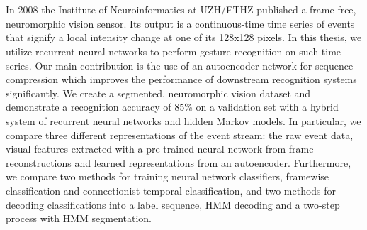 \chapter{\abstractname}

In 2008 the Institute of Neuroinformatics at UZH/ETHZ published a frame-free,
neuromorphic vision sensor. Its output is a continuous-time time series of
events that signify a local intensity change at one of its 128x128 pixels. In
this thesis, we utilize recurrent neural networks to perform gesture recognition
on such time series. Our main contribution is the use of an autoencoder network
for sequence compression which improves the performance of downstream
recognition systems significantly. We create a segmented, neuromorphic vision
dataset and demonstrate a recognition accuracy of 85\% on a validation set with
a hybrid system of recurrent neural networks and hidden Markov models. In
particular, we compare three different representations of the event stream: the
raw event data, visual features extracted with a pre-trained neural network from
frame reconstructions and learned representations from an autoencoder.
Furthermore, we compare two methods for training neural network classifiers,
framewise classification and connectionist temporal classification, and two
methods for decoding classifications into a label sequence, HMM decoding and a
two-step process with HMM segmentation.
